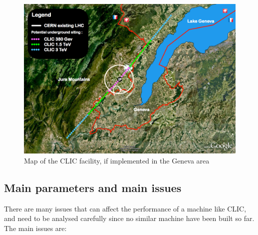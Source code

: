 \begin{figure}[h]
\centering

\includegraphics[scale=0.3]{pictures/CLIC_map}
\caption{Map of the CLIC facility, if implemented in the Geneva area}
\label{CLIC_map}

\end{figure}

 

\subsection{Main parameters and main issues}

There are many issues that can affect the performance of a machine like CLIC, and need to be analysed carefully since no similar machine have been built so far. The main issues are:

